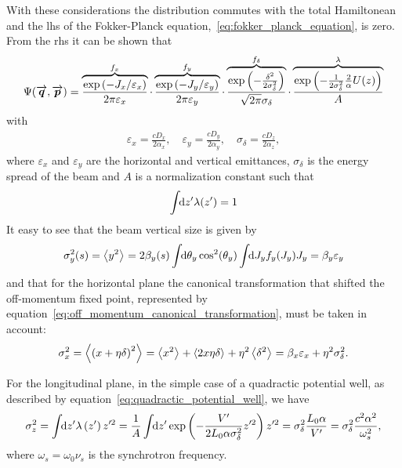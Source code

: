     With these considerations the distribution commutes with the total Hamiltonean and the \gls{lhs} of the Fokker-Planck equation,~\eqref{eq:fokker_planck_equation}, is zero. From the \gls{rhs} it can be shown that
    \begin{align}\label{eq:equilibrium_distribution}
        \Psi(\overrightarrow{\boldsymbol{q}},\overrightarrow{\boldsymbol{p}}) =
        \overbrace{
        \frac{\exp\left(-J_x/\varepsilon_x\right)}{2\pi\varepsilon_x}}^{f_x}\cdot
        \overbrace{
        \frac{\exp\left(-J_y/\varepsilon_y\right)}{2\pi\varepsilon_y}}^{f_y}\cdot
        \overbrace{
        \frac{\exp\left(-\frac{\delta^2}{2\sigma_\delta^2}\right)}{\sqrt{2\pi}\sigma_\delta}}^{f_\delta}\cdot
        \overbrace{
        \frac{\exp\left(-\frac{1}{2\sigma_\delta^2}\frac2\alpha U(z)\right)}{A}}^{\lambda}
    \end{align}
    with
    \begin{align}
        \varepsilon_x = \frac{cD_x}{2\alpha_x}, \quad
        \varepsilon_y = \frac{cD_y}{2\alpha_y}, \quad
        \sigma_\delta = \frac{cD_z}{2\alpha_z},
    \end{align}
    where $\varepsilon_x$ and $\varepsilon_y$ are the horizontal and vertical emittances, $\sigma_\delta$ is the energy spread of the beam and $A$ is a normalization constant such that
    \begin{align}
        \int\!\!\text{d}z' \lambda(z')=1
    \end{align}
    It easy to see that the beam vertical size is given by
    \begin{align}
        \sigma_y^2(s) = \left\langle y^2 \right\rangle_{{}} = 2\beta_y(s)\int\!\!\text{d}\theta_y \cos^2(\theta_y)\int\!\!\text{d}J_y f_y(J_y)J_y = \beta_y\varepsilon_y
    \end{align}
    and that for the horizontal plane the canonical transformation that shifted the off-momentum fixed point, represented by equation~\eqref{eq:off_momentum_canonical_transformation}, must be taken in account:
    \begin{align}
        \sigma_x^2 = \left\langle \left(x+\eta\delta\right)^2 \right\rangle_{{}} = \left\langle x^2 \right\rangle_{{}} + \left\langle 2x\eta\delta \right\rangle_{{}} + \eta^2\left\langle \delta^2 \right\rangle_{{}} = \beta_x\varepsilon_x + \eta^2\sigma_\delta^2.
    \end{align}

    For the longitudinal plane, in the simple case of a quadractic potential well, as described by equation~\eqref{eq:quadractic_potential_well}, we have
    \begin{align}
        \sigma_z^2 = \int\!\!\text{d}z' \lambda\left(z'\right)z'^2 =
        \frac1A\int\!\!\text{d}z' 
            \exp\left(-\frac{V'}{2L_0\alpha\sigma_\delta^2} z'^2\right)z'^2
        = \sigma_\delta^2\frac{L_0\alpha}{V'} = \sigma_\delta^2 \frac{c^2\alpha^2}{\omega_s^2},
    \end{align}
    where $\omega_s = \omega_0\nu_s$ is the synchrotron frequency.

